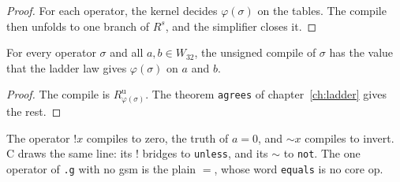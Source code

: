 \begin{proof}
For each operator, the kernel decides $\varphi(\sigma)$ on the tables. The compile then unfolds to one branch of
$R^{s}$, and the simplifier closes it.
\end{proof}

\begin{theorem}
For every operator $\sigma$ and all $a, b \in W_{32}$, the unsigned compile of $\sigma$ has the value that the
ladder law gives $\varphi(\sigma)$ on $a$ and $b$.
\end{theorem}

\begin{proof}
The compile is $R^{\mathrm{u}}_{\varphi(\sigma)}$. The theorem \texttt{agrees} of chapter~\ref{ch:ladder} gives
the rest.
\end{proof}

The operator $!x$ compiles to zero, the truth of $a = 0$, and $\sim x$ compiles to invert. C draws the same line:
its $!$ bridges to \texttt{unless}, and its $\sim$ to \texttt{not}. The one operator of \texttt{.g} with no gsm
is the plain $=$, whose word \texttt{equals} is no core op.
